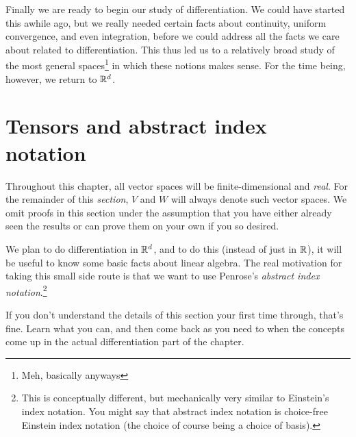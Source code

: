 Finally we are ready to begin our study of differentiation.  We could have started this awhile ago, but we really needed certain facts about continuity, uniform convergence, and even integration, before we could address all the facts we care about related to differentiation.  This thus led us to a relatively broad study of the most general spaces\footnote{Meh, basically anyways} in which these notions makes sense.  For the time being, however, we return to $\mathbb{R} ^d$.

\section{Tensors and abstract index notation}

\begin{displayquote}
Throughout this chapter, all vector spaces will be finite-dimensional and \emph{real}.  For the remainder of this \emph{section}, $V$ and $W$ will always denote such vector spaces.  We omit proofs in this section under the assumption that you have either already seen the results or can prove them on your own if you so desired.
\end{displayquote}

We plan to do differentiation in $\mathbb{R} ^d$, and to do this (instead of just in $\mathbb{R}$), it will be useful to know some basic facts about linear algebra.  The real motivation for taking this small side route is that we want to use Penrose's \emph{abstract index notation}.\footnote{This is conceptually different, but mechanically very similar to Einstein's index notation.  You might say that abstract index notation is choice-free Einstein index notation (the choice of course being a choice of basis).}

\begin{displayquote}
If you don't understand the details of this section your first time through, that's fine.  Learn what you can, and then come back as you need to when the concepts come up in the actual differentiation part of the chapter.
\end{displayquote}

